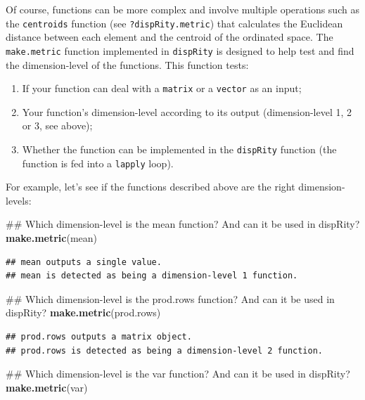 \documentclass[]{book}
\newenvironment{Shaded}{\begin{snugshade}}{\end{snugshade}}
\newcommand{\KeywordTok}[1]{\textcolor[rgb]{0.13,0.29,0.53}{\textbf{#1}}}
\newcommand{\NormalTok}[1]{#1}
\providecommand{\tightlist}{%
  \setlength{\itemsep}{0pt}\setlength{\parskip}{0pt}}
\theoremstyle{definition}
\theoremstyle{definition}
\theoremstyle{remark}
\begin{document}
Of course, functions can be more complex and involve multiple operations
such as the \texttt{centroids} function (see \texttt{?dispRity.metric})
that calculates the Euclidean distance between each element and the
centroid of the ordinated space. The \texttt{make.metric} function
implemented in \texttt{dispRity} is designed to help test and find the
dimension-level of the functions. This function tests:

\begin{enumerate}
\def\labelenumi{\arabic{enumi}.}
\tightlist
\item
  If your function can deal with a \texttt{matrix} or a \texttt{vector}
  as an input;
\item
  Your function's dimension-level according to its output
  (dimension-level 1, 2 or 3, see above);
\item
  Whether the function can be implemented in the \texttt{dispRity}
  function (the function is fed into a \texttt{lapply} loop).
\end{enumerate}

For example, let's see if the functions described above are the right
dimension-levels:

\begin{Shaded}
\begin{Highlighting}[]
\NormalTok{## Which dimension-level is the mean function? And can it be used in dispRity?}
\KeywordTok{make.metric}\NormalTok{(mean)}
\end{Highlighting}
\end{Shaded}

\begin{verbatim}
## mean outputs a single value.
## mean is detected as being a dimension-level 1 function.
\end{verbatim}

\begin{Shaded}
\begin{Highlighting}[]
\NormalTok{## Which dimension-level is the prod.rows function? And can it be used in dispRity?}
\KeywordTok{make.metric}\NormalTok{(prod.rows)}
\end{Highlighting}
\end{Shaded}

\begin{verbatim}
## prod.rows outputs a matrix object.
## prod.rows is detected as being a dimension-level 2 function.
\end{verbatim}

\begin{Shaded}
\begin{Highlighting}[]
\NormalTok{## Which dimension-level is the var function? And can it be used in dispRity?}
\KeywordTok{make.metric}\NormalTok{(var)}
\end{Highlighting}
\end{Shaded}
\end{document}
